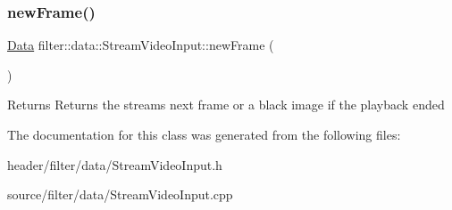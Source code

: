 \subsubsection{\texorpdfstring{new\+Frame()}{newFrame()}}
{\footnotesize\ttfamily \hyperlink{classfilter_1_1data_1_1_data}{Data} filter\+::data\+::\+Stream\+Video\+Input\+::new\+Frame (\begin{DoxyParamCaption}{ }\end{DoxyParamCaption})}

\begin{DoxyReturn}{Returns}
Returns the stream\textquotesingle{}s next frame or a black image if the playback ended 
\end{DoxyReturn}


The documentation for this class was generated from the following files\+:\begin{DoxyCompactItemize}
\item 
header/filter/data/Stream\+Video\+Input.\+h\item 
source/filter/data/Stream\+Video\+Input.\+cpp\end{DoxyCompactItemize}
